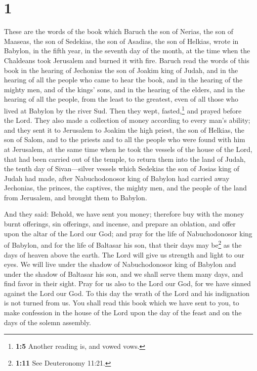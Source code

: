 \hypertarget{section}{%
\section{1}\label{section}}

 These are the words of the book which Baruch the son of
Nerias, the son of Maaseas, the son of Sedekias, the son of Asadias, the
son of Helkias, wrote in Babylon,  in the fifth year, in
the seventh day of the month, at the time when the Chaldeans took
Jerusalem and burned it with fire.  Baruch read the words
of this book in the hearing of Jechonias the son of Joakim king of
Judah, and in the hearing of all the people who came to hear the book,
 and in the hearing of the mighty men, and of the kings'
sons, and in the hearing of the elders, and in the hearing of all the
people, from the least to the greatest, even of all those who lived at
Babylon by the river Sud.  Then they wept,
fasted,\footnote{\textbf{1:5} Another reading is, and vowed vows.} and
prayed before the Lord.  They also made a collection of
money according to every man's ability;  and they sent it
to Jerusalem to Joakim the high priest, the son of Helkias, the son of
Salom, and to the priests and to all the people who were found with him
at Jerusalem,  at the same time when he took the vessels
of the house of the Lord, that had been carried out of the temple, to
return them into the land of Judah, the tenth day of Sivan---silver
vessels which Sedekias the son of Josias king of Judah had made,
 after Nabuchodonosor king of Babylon had carried away
Jechonias, the princes, the captives, the mighty men, and the people of
the land from Jerusalem, and brought them to Babylon.

 And they said: Behold, we have sent you money; therefore
buy with the money burnt offerings, sin offerings, and incense, and
prepare an oblation, and offer upon the altar of the Lord our God;
 and pray for the life of Nabuchodonosor king of Babylon,
and for the life of Baltasar his son, that their days may be\footnote{\textbf{1:11}
  See Deuteronomy 11:21.} as the days of heaven above the earth.
 The Lord will give us strength and light to our eyes. We
will live under the shadow of Nabuchodonosor king of Babylon and under
the shadow of Baltasar his son, and we shall serve them many days, and
find favor in their sight.  Pray for us also to the Lord
our God, for we have sinned against the Lord our God. To this day the
wrath of the Lord and his indignation is not turned from us.
 You shall read this book which we have sent to you, to
make confession in the house of the Lord upon the day of the feast and
on the days of the solemn assembly.

